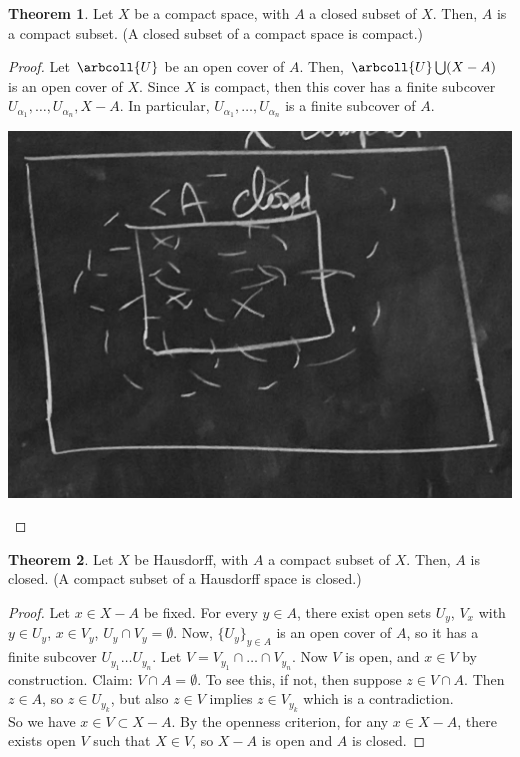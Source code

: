 \documentclass[a5paper]{article}
\theoremstyle{definition}%
\newtheorem{theorem}{Theorem}
\numberwithin{exercise}{section}
\theoremstyle{remark}%
\begin{document}
\begin{highlight}
\begin{theorem}
Let $X$ be a compact space, with $A$ a closed subset of $X$. Then, $A$ is a compact subset. (A closed subset of a compact space is compact.)
\end{theorem}
\end{highlight}
\begin{proof}
Let $\arbcoll{U}$ be an open cover of $A$. Then, $\arbcoll{U}\bigcup(X-A)$ is an open cover of $X$. Since $X$ is compact, then this cover has a finite subcover $U_{\alpha_1}, \ldots, U_{\alpha_n}, X-A$. In particular, $U_{\alpha_1}, \ldots, U_{\alpha_n}$ is a finite subcover of $A$. 

\begin{center}
\includegraphics[scale=.12]{images/thm18_fig}
\end{center}

\end{proof}

\begin{highlight}
\begin{theorem}
Let $X$ be Hausdorff, with $A$ a compact subset of $X$. Then, $A$ is closed. (A compact subset of a Hausdorff space is closed.)
\end{theorem}
\end{highlight}
\begin{proof}
Let $x\in X-A$ be fixed. For every $y\in A$, there exist open sets $U_y$, $V_x$ with $y\in U_y$, $x\in V_y$, $U_y\cap V_y = \emptyset$. Now, $\{U_y\}_{y\in A}$ is an open cover of $A$, so it has a finite subcover $U_{y_1}\ldots U_{y_n}$. Let $V = V_{y_1}\cap \ldots \cap V_{y_n}$. Now $V$ is open, and $x\in V$ by construction.
Claim: $V\cap A=\emptyset$. To see this, if not, then suppose $z\in V \cap A$. Then $z\in A$, so $z\in U_{y_k}$, but also $z\in V$ implies $z\in V_{y_k}$ which is a contradiction. \\
So we have $x\in V\subset X-A$. By the openness criterion, for any $x\in X-A$, there exists open $V$ such that $X\in V$, so $X-A$ is open and $A$ is closed. 
\end{proof}
\end{document}
